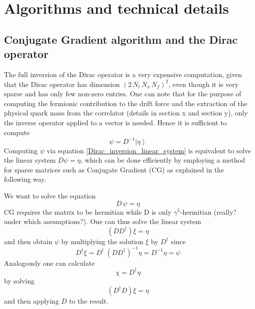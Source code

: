 \chapter{Algorithms and technical details}
\label{chapt:AppendixC}

\section{Conjugate Gradient algorithm and the Dirac operator}
The full inversion of the Dirac operator is a very expensive computation, given that the Dirac operator has dimension $(2 \, N_t \, N_x \, N_f)^2$, even though it is very sparse and has only few non-zero entries. One can note that for the purpose of computing the fermionic contribution to the drift force and the extraction of the physical quark mass from the correlator (details in section x and section y), only the inverse operator applied to a vector is needed. Hence it is sufficient to compute 
\begin{equation}
    \psi = D^{-1} \left| \eta \right\rangle
    \label{Dirac_inversion_linear_system}
\end{equation}
Computing $\psi$ via equation \eqref{Dirac_inversion_linear_system} is equivalent to solve the linear system $D \psi = \eta$, which can be done efficiently by employing a method for sparse matrices such as Conjugate Gradient (CG) as explained in the following way.

We want to solve the equation
\begin{equation*} 
    D \, \psi = \eta
\end{equation*}
CG requires the matrix to be hermitian while D is only $\gamma^5$-hermitian (really? under which assumptions?). One can thus solve the linear system
\begin{equation*}
    \left(D D^{\dagger} \right) \xi = \eta
\end{equation*}
and then obtain $\psi$ by multiplying the solution $\xi$ by $D^{\dagger}$ since 
\begin{equation}
    D^{\dagger} \xi = D^{\dagger} \ \left(D D^{\dagger}\right)^{-1} \eta = D^{-1} \eta = \psi
\end{equation}
Analogously one can calculate
\begin{equation*}
    \chi = D^{\dagger} \eta
\end{equation*}
by solving
\begin{equation*}
    \left(D^{\dagger} D\right) \xi = \eta
\end{equation*}
and then applying $D$ to the result.

